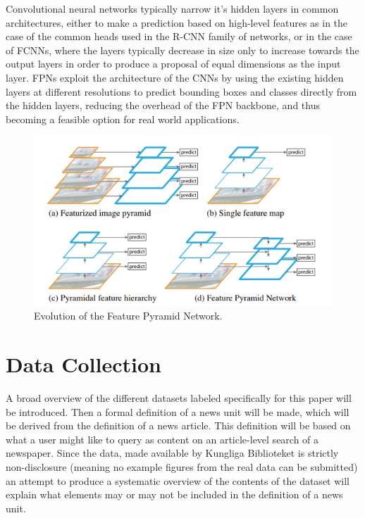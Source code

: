 \documentclass[english, bibtex]{kththesis}
\begin{document}
Convolutional neural networks typically narrow it’s hidden layers in common architectures, either to make a prediction based on high-level features as in the case of the common heads used in the R-CNN family of networks, or in the case of FCNNs, where the layers typically decrease in size only to increase towards the output layers in order to produce a proposal of equal dimensions as the input layer. FPNs exploit the architecture of the CNNs by using the existing hidden layers at different resolutions to predict bounding boxes and classes directly from the hidden layers, reducing the overhead of the FPN backbone, and thus becoming a feasible option for real world applications.

\begin{figure}[H]
  \begin{center}
    \includegraphics[width=1.0\textwidth]{figures/fpn.png}
  \end{center}
  \caption{Evolution of the Feature Pyramid Network\cite{DBLP:journals/corr/LinDGHHB16}.}
  \label{fig:fpn}
\end{figure}

\chapter{Data Collection}
\label{ch:data}

A broad overview of the different datasets labeled specifically for this paper will be introduced. Then a formal definition of a news unit will be made, which will be derived from the definition of a news article. This definition will be based on what a user might like to query as content on an article-level search of a newspaper. Since the data, made available by Kungliga Biblioteket is strictly non-disclosure (meaning no example figures from the real data can be submitted) an attempt to produce a systematic overview of the contents of the dataset will explain what elements may or may not be included in the definition of a news unit.
\end{document}

